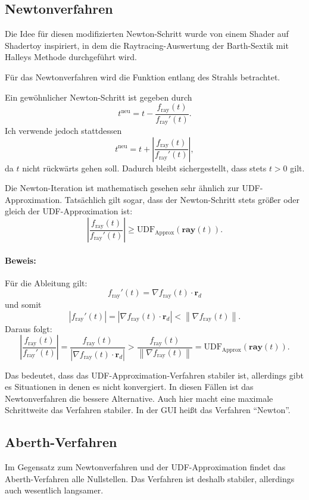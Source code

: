 \documentclass[
	ngerman,%
	accentcolor=9c,%
	ruledheaders=section,%
	class=report,%
	thesis={type=bachelor},%
	fontsize=11pt,%
	parskip=half-,%
	custommargins=true,%
	marginpar=false,%
]{tudapub}
\begin{document}

    \subsection{Newtonverfahren}
Die Idee für diesen modifizierten Newton-Schritt wurde von einem Shader auf Shadertoy \cite{shadertoy_barth_sextic} inspiriert, in dem die Raytracing-Auswertung der Barth-Sextik mit Halleys Methode durchgeführt wird.

Für das Newtonverfahren wird die Funktion entlang des Strahls betrachtet.   

Ein gewöhnlicher Newton-Schritt ist gegeben durch  
\[
t^{\text{neu}} = t - \frac{f_{\text{ray}}(t)}{f_{\text{ray}}'(t)}.
\]  
Ich verwende jedoch stattdessen  
\[
t^{\text{neu}} = t + \left| \frac{f_{\text{ray}}(t)}{f_{\text{ray}}'(t)} \right|,
\]  
da \( t \) nicht rückwärts gehen soll. Dadurch bleibt sichergestellt, dass stets \( t > 0 \) gilt.  

Die Newton-Iteration ist mathematisch gesehen sehr ähnlich zur UDF-Approximation. Tatsächlich gilt sogar, dass der Newton-Schritt stets größer oder gleich der UDF-Approximation ist:
\[
\left| \frac{f_{\text{ray}}(t)}{f_{\text{ray}}'(t)} \right| \geq \text{UDF}_\text{Approx}(\mathbf{ray}(t)).
\]

\paragraph{Beweis:}  
Für die Ableitung gilt:
\[
f_{\text{ray}}'(t) = \nabla f_{\text{ray}}(t) \cdot \mathbf{r}_d
\]
und somit
\[
|f_{\text{ray}}'(t)| = |\nabla f_{\text{ray}}(t) \cdot \mathbf{r}_d| < \left\lVert \nabla f_{\text{ray}}(t)\right\rVert.
\]  
Daraus folgt:
\[
\left| \frac{f_{\text{ray}}(t)}{f_{\text{ray}}'(t)} \right| =
\frac{f_{\text{ray}}(t)}{|\nabla f_{\text{ray}}(t) \cdot \mathbf{r}_d|} > 
\frac{f_{\text{ray}}(t)}{\left\lVert \nabla f_{\text{ray}}(t) \right\rVert} = 
\text{UDF}_\text{Approx}(\mathbf{ray}(t)).
\]


Das bedeutet, dass das UDF-Approximation-Verfahren stabiler ist, allerdings gibt es Situationen in denen es nicht konvergiert. In diesen Fällen ist das Newtonverfahren die bessere Alternative.
Auch hier macht eine maximale Schrittweite das Verfahren stabiler.
In der GUI heißt das Verfahren \enquote{Newton}.

\subsection{Aberth-Verfahren}
Im Gegensatz zum Newtonverfahren und der UDF-Approximation findet das Aberth-Verfahren alle Nullstellen. Das Verfahren ist deshalb stabiler, allerdings auch wesentlich langsamer.
\end{document}
